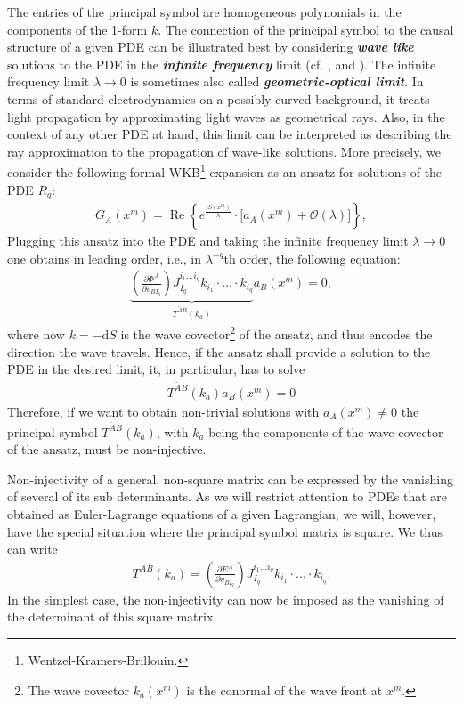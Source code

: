 The entries of the principal symbol are homogeneous polynomials in the components of the 1-form $k$.
The connection of the principal symbol to the causal structure of a given PDE can be illustrated best by considering \textit{\textbf{wave like}} solutions to the PDE in the \textit{\textbf{infinite frequency}} limit (cf. \cite{2012arXiv1211.1914K}, \cite{2011PhRvD..83d4047R} and \cite{2018PhRvD..97h4036D}). 
The infinite frequency limit $\lambda \rightarrow 0 $ is sometimes also called \textit{\textbf{geometric-optical limit}}. In terms of standard electrodynamics on a possibly curved background, it treats light propagation by approximating light waves as geometrical rays. Also, in the context of any other PDE at hand, this limit can be interpreted as describing the ray approximation to the propagation of wave-like solutions.
More precisely, we consider the following formal WKB\footnote{Wentzel-Kramers-Brillouin.} expansion as an ansatz for solutions of the PDE $R_q$:
\begin{align}\label{waveAns}
    G_A(x^m) = \operatorname{Re}\left \{ e^{\frac{iS(x^m)}{\lambda}} \cdot   \bigl [ a_A(x^m) + \mathcal{O}(\lambda) \bigr ]\right \},
\end{align}
Plugging this ansatz into the PDE and taking the infinite frequency limit $\lambda \rightarrow 0$ one obtains in leading order, i.e., in $\lambda^{-q}$th order, the following equation:
\begin{align}
    \underbrace{\left ( \frac{\partial \Phi^{\tilde{A}}}{\partial v_{BI_q}} \right ) J_{I_q}^{i_1...i_q} k_{i_1} \cdot ... \cdot k_{i_q}}_{T^{\tilde{A} B}(k_a)} a_B(x^m) = 0,
\end{align}
where now $k = -\mathrm{d}S$ is the wave covector\footnote{The wave covector $k_a(x^m)$ is the conormal of the wave front at $x^m$.} of the ansatz, and thus encodes the direction the wave travels. Hence, if the ansatz shall provide a solution to the PDE in the desired limit, it, in particular, has to solve 
\begin{align}\label{solvabilityCond}
    T^{\tilde{A} B}(k_a) a_B(x^m) = 0
\end{align} 
Therefore, if we want to obtain non-trivial solutions with $a_A(x^m) \neq 0$ the principal symbol
$T^{\tilde{A} B}(k_a)$, with $k_a$ being the components of the wave covector of the ansatz, must be non-injective.

Non-injectivity of a general, non-square matrix can be expressed by the vanishing of several of its sub determinants. As we will restrict attention to PDEs that are obtained as Euler-Lagrange equations of a given Lagrangian, we will, however, have the special situation where the principal symbol matrix is square. We thus can write
\begin{align}
T^{A B}(k_a) =  \left ( \frac{\partial E^{A}}{\partial v_{BI_q}} \right ) J_{I_q}^{i_1...i_q} k_{i_1} \cdot ... \cdot k_{i_q}.
\end{align}
In the simplest case, the non-injectivity can now be imposed as the vanishing of the determinant of this square matrix.

